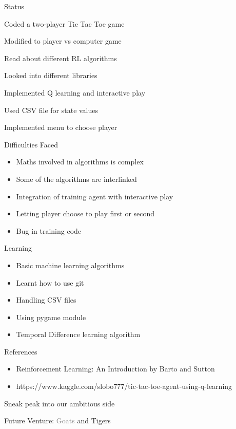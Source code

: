 \documentclass[14pt]{beamer}
\begin{document}
\begin{frame}{Status}
    \begin{description}[STATUS]
        \item[\color{myPink}{24 Jun 2020}] Coded a two-player Tic Tac Toe game
        \item[\color{myPink}{27 Jun 2020}] Modified to player vs computer game
        \item[\color{myPink}{29 Jun 2020}] Read about different RL algorithms
        \item[\color{myPink}{04 Jul 2020}] Looked into different libraries
        \item[\color{myPink}{11 Jul 2020}] Implemented Q learning and interactive play
        \item[\color{myPink}{12 Jul 2020}] Used CSV file for state values
        \item[\color{myPink}{10 Aug 2020}] Implemented menu to choose player
    \end{description}
\end{frame}

\begin{frame}{Difficulties Faced}
    \begin{itemize}
        \item Maths involved in algorithms is complex
        \item Some of the algorithms are interlinked
        \item Integration of training agent with interactive play
        \item Letting player choose to play first or second
        \item Bug in training code
    \end{itemize}
\end{frame}

\begin{frame}{Learning}
    \begin{itemize}
        \item Basic machine learning algorithms
        \item Learnt how to use git
        \item Handling CSV files
        \item Using pygame module
        \item Temporal Difference learning algorithm
    \end{itemize}
\end{frame}

\begin{frame}{References}
    \begin{itemize}
        \item Reinforcement Learning: An Introduction by Barto and Sutton
        \item https://www.kaggle.com/slobo777/tic-tac-toe-agent-using-q-learning
    \end{itemize}
\end{frame}

\begin{frame}{Sneak peak into our ambitious side}
    \begin{center}
        Future Venture: \textcolor{gray}{Goats} and \textcolor{myAmber}{Tigers}
    \end{center}
\end{frame}
\end{document}

